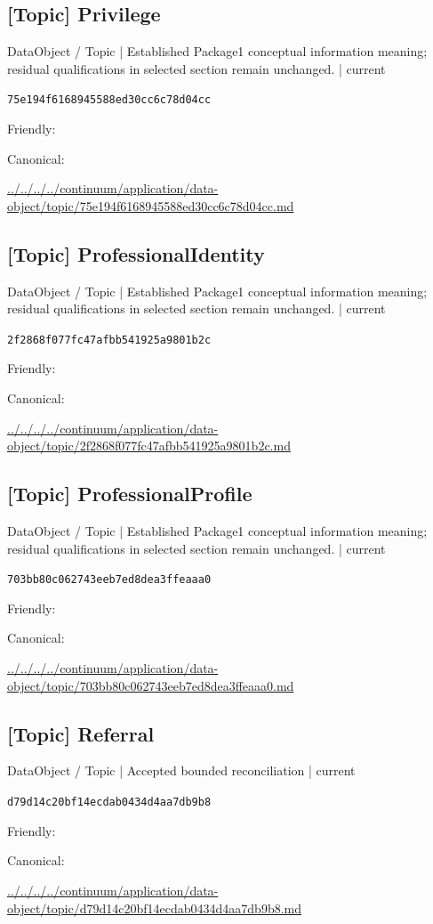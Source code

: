 \documentclass[10pt,a4paper]{article}
\begin{document}
\subsection*{[Topic] Privilege}
{\small DataObject / Topic | Established Package1 conceptual information meaning; residual qualifications in selected section remain unchanged. | current}\par
\texttt{75e194f6168945588ed30cc6c78d04cc}\par
Friendly: \par
Canonical: \par
{\footnotesize\url{../../../../continuum/application/data-object/topic/75e194f6168945588ed30cc6c78d04cc.md}}\par
\subsection*{[Topic] ProfessionalIdentity}
{\small DataObject / Topic | Established Package1 conceptual information meaning; residual qualifications in selected section remain unchanged. | current}\par
\texttt{2f2868f077fc47afbb541925a9801b2c}\par
Friendly: \par
Canonical: \par
{\footnotesize\url{../../../../continuum/application/data-object/topic/2f2868f077fc47afbb541925a9801b2c.md}}\par
\subsection*{[Topic] ProfessionalProfile}
{\small DataObject / Topic | Established Package1 conceptual information meaning; residual qualifications in selected section remain unchanged. | current}\par
\texttt{703bb80c062743eeb7ed8dea3ffeaaa0}\par
Friendly: \par
Canonical: \par
{\footnotesize\url{../../../../continuum/application/data-object/topic/703bb80c062743eeb7ed8dea3ffeaaa0.md}}\par
\subsection*{[Topic] Referral}
{\small DataObject / Topic | Accepted bounded reconciliation | current}\par
\texttt{d79d14c20bf14ecdab0434d4aa7db9b8}\par
Friendly: \par
Canonical: \par
{\footnotesize\url{../../../../continuum/application/data-object/topic/d79d14c20bf14ecdab0434d4aa7db9b8.md}}\par
\end{document}
